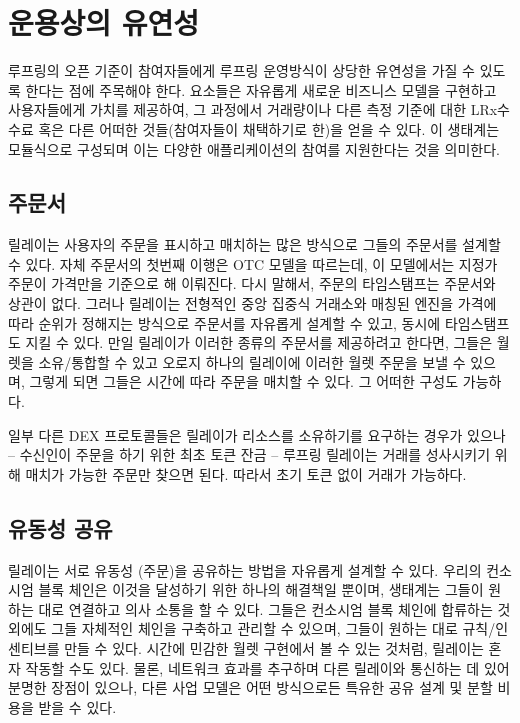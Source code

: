 \documentclass{article}
\begin{document}
\begin{multicols}{2}
\begin{enumerate}
\end{enumerate}



\section{운용상의 유연성\label{sec:business_model}}
루프링의 오픈 기준이 참여자들에게 루프링 운영방식이 상당한 유연성을 가질 수 있도록 한다는 점에 주목해야 한다. 요소들은 자유롭게 새로운 비즈니스 모델을 구현하고 사용자들에게 가치를 제공하여, 그 과정에서 거래량이나 다른 측정 기준에 대한 LRx수수료 혹은 다른 어떠한 것들(참여자들이 채택하기로 한)을 얻을 수 있다. 이 생태계는 모듈식으로 구성되며 이는 다양한 애플리케이션의 참여를 지원한다는 것을 의미한다.

\subsection{주문서\label{sec:order_book}}
릴레이는 사용자의 주문을 표시하고 매치하는 많은 방식으로 그들의 주문서를 설계할 수 있다. 자체 주문서의 첫번째 이행은 OTC 모델을 따르는데, 이 모델에서는 지정가 주문이 가격만을 기준으로 해 이뤄진다. 다시 말해서, 주문의 타임스탬프는 주문서와 상관이 없다. 그러나 릴레이는 전형적인 중앙 집중식 거래소와 매칭된 엔진을 가격에 따라 순위가 정해지는 방식으로 주문서를 자유롭게 설계할 수 있고, 동시에 타임스탬프도 지킬 수 있다. 만일 릴레이가 이러한 종류의 주문서를 제공하려고 한다면, 그들은 월렛을 소유/통합할 수 있고 오로지 하나의 릴레이에 이러한 월렛 주문을 보낼 수 있으며, 그렇게 되면 그들은 시간에 따라 주문을 매치할 수 있다. 그 어떠한 구성도 가능하다.

일부 다른 DEX 프로토콜들은 릴레이가 리소스를 소유하기를 요구하는 경우가 있으나 – 수신인이 주문을 하기 위한 최초 토큰 잔금 – 루프링 릴레이는 거래를 성사시키기 위해 매치가 가능한 주문만 찾으면 된다. 따라서 초기 토큰 없이 거래가 가능하다.

\subsection{유동성 공유\label{sec:liquidity_sharing}}
릴레이는 서로 유동성 (주문)을 공유하는 방법을 자유롭게 설계할 수 있다. 우리의 컨소시엄 블록 체인은 이것을 달성하기 위한 하나의 해결책일 뿐이며, 생태계는 그들이 원하는 대로 연결하고 의사 소통을 할 수 있다. 그들은 컨소시엄 블록 체인에 합류하는 것 외에도 그들 자체적인 체인을 구축하고 관리할 수 있으며, 그들이 원하는 대로 규칙/인센티브를 만들 수 있다. 시간에 민감한 월렛 구현에서 볼 수 있는 것처럼, 릴레이는 혼자 작동할 수도 있다. 물론, 네트워크 효과를 추구하며 다른 릴레이와 통신하는 데 있어 분명한 장점이 있으나, 다른 사업 모델은 어떤 방식으로든 특유한 공유 설계 및 분할 비용을 받을 수 있다.




\end{multicols}
\end{document}

